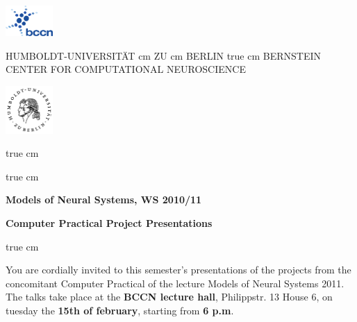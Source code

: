 \documentclass[12pt]{article}
\begin{document}
\parbox{2cm}{
\includegraphics[width=1.8cm]{../bccnlogo.pdf}
}
\parbox{11cm}{
\begin{center}
\large HUMBOLDT-UNIVERSIT\"AT  cm ZU  cm BERLIN
 true cm
\mgross BERNSTEIN CENTER FOR COMPUTATIONAL NEUROSCIENCE
\end{center}
}
\parbox{2cm}
{
\hfill
\includegraphics[width=1.8cm]{../hublogo.pdf}
}

 true cm



 true cm
\centerline{\bf Models of Neural Systems, WS 2010/11}
\centerline{\bf Computer Practical Project Presentations}

 true cm

You are cordially invited to this semester's presentations of the projects
from the concomitant Computer Practical of the lecture Models of Neural
Systems 2011. The talks take place at the \textbf{BCCN lecture hall},
Philippstr. 13 House 6, on tuesday the \textbf{15th of february}, starting from
\textbf{6 p.m}.
\end{document}
